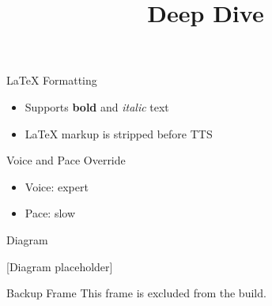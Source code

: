 \documentclass{beamer}
\title{Deep Dive}
\begin{document}
\begin{frame}{LaTeX Formatting}
  \begin{itemize}
    \item Supports \textbf{bold} and \emph{italic} text
    \item LaTeX markup is stripped before TTS
  \end{itemize}
\end{frame}

\begin{frame}{Voice and Pace Override}
  \begin{itemize}
    \item Voice: expert
    \item Pace: slow
  \end{itemize}
\end{frame}

\begin{frame}{Diagram}
  \begin{center}
    [Diagram placeholder]
  \end{center}
  \silent
\end{frame}

\begin{frame}{Backup Frame}
  This frame is excluded from the build.
  \slidesonnetskip
\end{frame}
\end{document}
